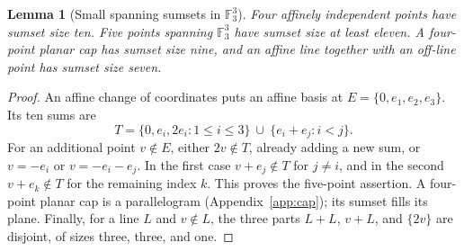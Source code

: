 \documentclass[11pt]{article}
\newtheorem{lemma}[theorem]{Lemma}
\theoremstyle{remark}\newtheorem{remark}[theorem]{Remark}
\newcommand{\F}{\mathbb F_3}
\begin{document}
\begin{lemma}[Small spanning sumsets in $\F^3$]\label{lem:sumset}
Four affinely independent points have sumset size ten. Five points spanning
$\F^3$ have sumset size at least eleven. A four-point planar cap has sumset
size nine, and an affine line together with an off-line point has sumset
size seven.
\end{lemma}
\begin{proof}
An affine change of coordinates puts an affine basis at
$E=\{0,e_1,e_2,e_3\}$. Its ten sums are
\[
 T=\{0,e_i,2e_i:1\leq i\leq3\}\ \cup\ \{e_i+e_j:i<j\}.
\]
For an additional point $v\notin E$, either $2v\notin T$, already adding a
new sum, or $v=-e_i$ or $v=-e_i-e_j$. In the first case $v+e_j\notin T$
for $j\ne i$, and in the second $v+e_k\notin T$ for the remaining index $k$.
This proves the five-point assertion. A four-point planar cap is a
parallelogram (Appendix~\ref{app:cap}); its sumset fills its plane. Finally,
for a line $L$ and $v\notin L$, the three parts $L+L$, $v+L$, and $\{2v\}$
are disjoint, of sizes three, three, and one.
\end{proof}
\end{document}

